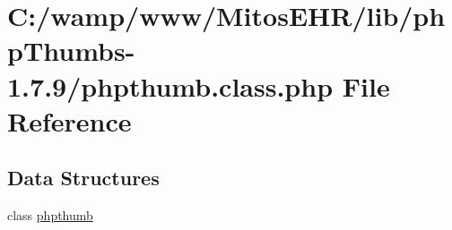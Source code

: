 \hypertarget{phpthumb_8class_8php}{\section{\-C\-:/wamp/www/\-Mitos\-E\-H\-R/lib/php\-Thumbs-\/1.7.9/phpthumb.class.\-php \-File \-Reference}
\label{phpthumb_8class_8php}
}
\subsection*{\-Data \-Structures}
\begin{DoxyCompactItemize}
\item 
class \hyperlink{classphpthumb}{phpthumb}
\end{DoxyCompactItemize}
